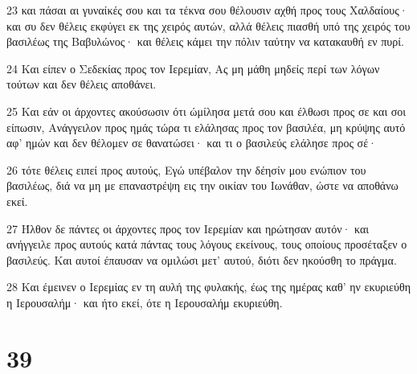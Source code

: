 \par 23 και πάσαι αι γυναίκές σου και τα τέκνα σου θέλουσιν αχθή προς τους Χαλδαίους· και συ δεν θέλεις εκφύγει εκ της χειρός αυτών, αλλά θέλεις πιασθή υπό της χειρός του βασιλέως της Βαβυλώνος· και θέλεις κάμει την πόλιν ταύτην να κατακαυθή εν πυρί.
\par 24 Και είπεν ο Σεδεκίας προς τον Ιερεμίαν, Ας μη μάθη μηδείς περί των λόγων τούτων και δεν θέλεις αποθάνει.
\par 25 Και εάν οι άρχοντες ακούσωσιν ότι ώμίλησα μετά σου και έλθωσι προς σε και σοι είπωσιν, Ανάγγειλον προς ημάς τώρα τι ελάλησας προς τον βασιλέα, μη κρύψης αυτό αφ' ημών και δεν θέλομεν σε θανατώσει· και τι ο βασιλεύς ελάλησε προς σέ·
\par 26 τότε θέλεις ειπεί προς αυτούς, Εγώ υπέβαλον την δέησίν μου ενώπιον του βασιλέως, διά να μη με επαναστρέψη εις την οικίαν του Ιωνάθαν, ώστε να αποθάνω εκεί.
\par 27 Ήλθον δε πάντες οι άρχοντες προς τον Ιερεμίαν και ηρώτησαν αυτόν· και ανήγγειλε προς αυτούς κατά πάντας τους λόγους εκείνους, τους οποίους προσέταξεν ο βασιλεύς. Και αυτοί έπαυσαν να ομιλώσι μετ' αυτού, διότι δεν ηκούσθη το πράγμα.
\par 28 Και έμεινεν ο Ιερεμίας εν τη αυλή της φυλακής, έως της ημέρας καθ' ην εκυριεύθη η Ιερουσαλήμ· και ήτο εκεί, ότε η Ιερουσαλήμ εκυριεύθη.

\chapter{39}

